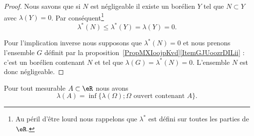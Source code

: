 \begin{proof}
    Nous savons que si \( N\) est négligeable il existe un borélien \( Y\) tel que \( N\subset Y\) avec \( \lambda(Y)=0\). Par conséquent\footnote{Au péril d'être lourd nous rappelons que \( \lambda^*\) est défini sur toutes les parties de \( \eR\).}
    \begin{equation}
        \lambda^*(N)\leq \lambda^*(Y)=\lambda(Y)=0.
    \end{equation}

    Pour l'implication inverse nous supposons que \( \lambda^*(N)=0\) et nous prenons l'ensemble \( G\) définit par la proposition~\ref{PropMXIoojpKvd}\ref{ItemGJUoozrDILii} : c'est un borélien contenant \( N\) et tel que \( \lambda(G)=\lambda^*(N)=0\). L'ensemble \( N\) est donc négligeable.
\end{proof}

\begin{theorem} \label{ThoHFXooONFRN}
    Pour tout mesurable \( A\subset \eR\) nous avons
    \begin{equation}
        \lambda(A)=\inf\{ \lambda(\Omega); \Omega\text{ ouvert contenant } A \}.
    \end{equation}
\end{theorem}

